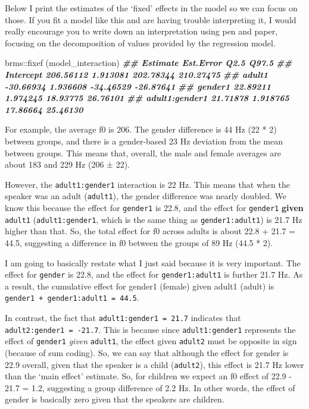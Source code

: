 \documentclass[
]{book}
\newenvironment{Shaded}{\begin{snugshade}}{\end{snugshade}}
\newcommand{\DocumentationTok}[1]{\textcolor[rgb]{0.56,0.35,0.01}{\textbf{\textit{#1}}}}
\newcommand{\FunctionTok}[1]{\textcolor[rgb]{0.00,0.00,0.00}{#1}}
\newcommand{\NormalTok}[1]{#1}
\newcommand{\SpecialCharTok}[1]{\textcolor[rgb]{0.00,0.00,0.00}{#1}}
\begin{document}
Below I print the estimates of the `fixed' effects in the model so we can focus on those. If you fit a model like this and are having trouble interpreting it, I would really encourage you to write down an interpretation using pen and paper, focusing on the decomposition of values provided by the regression model.

\begin{Shaded}
\begin{Highlighting}[]
\NormalTok{brms}\SpecialCharTok{::}\FunctionTok{fixef}\NormalTok{ (model\_interaction)}
\DocumentationTok{\#\#                 Estimate Est.Error      Q2.5     Q97.5}
\DocumentationTok{\#\# Intercept      206.56112  1.913081 202.78344 210.27475}
\DocumentationTok{\#\# adult1         {-}30.66934  1.936608 {-}34.46529 {-}26.87641}
\DocumentationTok{\#\# gender1         22.89211  1.974245  18.93775  26.76101}
\DocumentationTok{\#\# adult1:gender1  21.71878  1.918765  17.86664  25.46130}
\end{Highlighting}
\end{Shaded}

For example, the average f0 is 206. The gender difference is 44 Hz (22 * 2) between groups, and there is a gender-based 23 Hz deviation from the mean between groups. This means that, overall, the male and female averages are about 183 and 229 Hz (206 ± 22).

However, the \texttt{adult1:gender1} interaction is 22 Hz. This means that when the speaker was an adult (\texttt{adult1}), the gender difference was nearly doubled. We know this because the effect for \texttt{gender1} is 22.8, and the effect for \texttt{gender1} \textbf{given} \texttt{adult1} (\texttt{adult1:gender1}, which is the same thing as \texttt{gender1:adult1}) is 21.7 Hz higher than that. So, the total effect for f0 across adults is about 22.8 + 21.7 = 44.5, suggesting a difference in f0 between the groups of 89 Hz (44.5 * 2).

I am going to basically restate what I just said because it is very important. The effect for \texttt{gender} is 22.8, and the effect for \texttt{gender1:adult1} is further 21.7 Hz. As a result, the cumulative effect for gender1 (female) given adult1 (adult) is \texttt{gender1\ +\ gender1:adult1\ =\ 44.5}.

In contrast, the fact that \texttt{adult1:gender1\ =\ 21.7} indicates that \texttt{adult2:gender1\ =\ -21.7}. This is because since \texttt{adult1:gender1} represents the effect of \texttt{gender1} \emph{given} \texttt{adult1}, the effect given \texttt{adult2} must be opposite in sign (because of sum coding). So, we can say that although the effect for gender is 22.9 overall, given that the speaker is a child (\texttt{adult2}), this effect is 21.7 Hz lower than the `main effect' estimate. So, for children we expect an f0 effect of 22.9 - 21.7 = 1.2, suggesting a group difference of 2.2 Hz. In other words, the effect of gender is basically zero given that the speakers are children.
\end{document}
